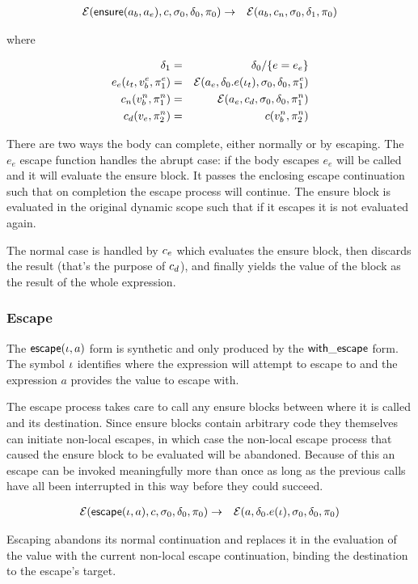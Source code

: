 \documentclass{article}
\begin{document}
\begin{eqnarray*}
\mathcal{E}(\mathsf{ensure}(a_b, a_e), c, \sigma_0, \delta_0, \pi_0) & \to &
\mathcal{E}(a_b, c_n, \sigma_0, \delta_1, \pi_0)
\end{eqnarray*}

where

\begin{eqnarray*}
\delta_1 & = & \delta_0 / \{ e = e_e \} \\
e_e(\iota_t, v^e_b, \pi^e_1) & = & \mathcal{E}(a_e, \delta_0.e(\iota_t), \sigma_0, \delta_0, \pi^e_1) \\
c_n(v^n_b, \pi^n_1) & = & \mathcal{E}(a_e, c_d, \sigma_0, \delta_0, \pi^n_1) \\
c_d(v_e, \pi^n_2) & = & c(v^n_b, \pi^n_2)
\end{eqnarray*}

There are two ways the body can complete, either normally or by escaping. The
$e_e$ escape function handles the abrupt case: if the body escapes $e_e$ will
be called and it will evaluate the ensure block. It passes the enclosing escape
continuation such that on completion the escape process will continue. The ensure
block is evaluated in the original dynamic scope such that if it escapes it is
not evaluated again.

The normal case is handled by $c_e$ which evaluates the ensure block, then
discards the result (that's the purpose of $c_d$), and finally yields the
value of the block as the result of the whole expression.

\subsubsection{Escape}

The $\mathsf{escape}(\iota, a)$ form is synthetic and only produced by the
$\mathsf{with\_escape}$ form. The symbol $\iota$ identifies where the expression
will attempt to escape to and the expression $a$ provides the value to escape
with.

The escape process takes care to call any ensure blocks between where it is
called and its destination. Since ensure blocks contain arbitrary code they
themselves can initiate non-local escapes, in which case the non-local escape
process that caused the ensure block to be evaluated will be abandoned. Because
of this an escape can be invoked meaningfully more than once as long as the
previous calls have all been interrupted in this way before they could succeed.

\begin{eqnarray*}
\mathcal{E}(\mathsf{escape}(\iota, a), c, \sigma_0, \delta_0, \pi_0) & \to &
\mathcal{E}(a, \delta_0.e(\iota), \sigma_0, \delta_0, \pi_0)
\end{eqnarray*}

Escaping abandons its normal continuation and replaces it in the evaluation of
the value with the current non-local escape continuation, binding the destination
to the escape's target.
\end{document}
